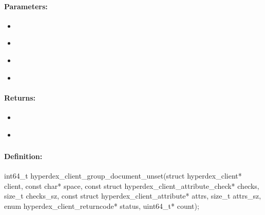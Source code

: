 \paragraph{Parameters:}
\begin{itemize}[noitemsep]
\item {}\\

\item {}\\

\item {}\\

\item {}\\

\end{itemize}

\paragraph{Returns:}
\begin{itemize}[noitemsep]
\item {}\\

\item {}\\

\end{itemize}

\pagebreak
\subsubsection{}
\label{api:c:group_document_unset}


\paragraph{Definition:}
\begin{ccode}
int64_t hyperdex_client_group_document_unset(struct hyperdex_client* client,
        const char* space,
        const struct hyperdex_client_attribute_check* checks, size_t checks_sz,
        const struct hyperdex_client_attribute* attrs, size_t attrs_sz,
        enum hyperdex_client_returncode* status,
        uint64_t* count);
\end{ccode}

